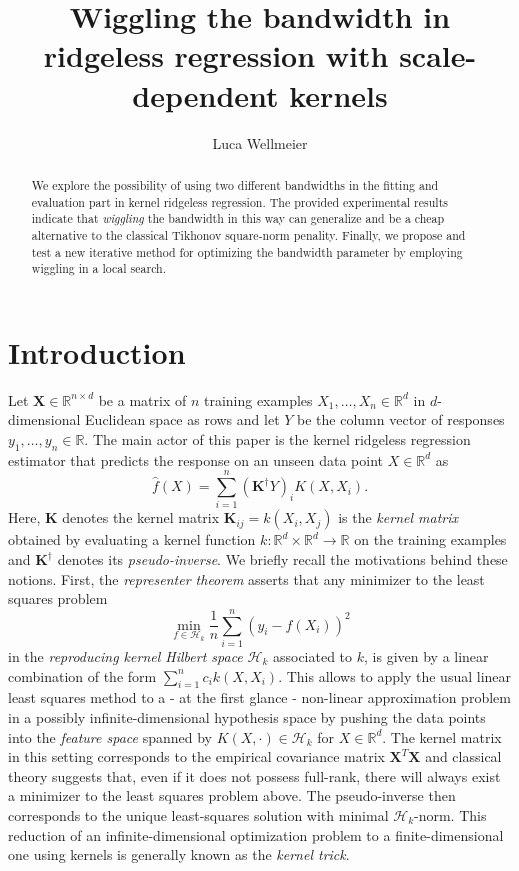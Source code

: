 \documentclass[12pt]{amsart}
\title{Wiggling the bandwidth in ridgeless regression 
        with scale-dependent kernels}
\author{Luca Wellmeier}
\newcommand{\R}{\mathbb{R}}
\begin{document}
\begin{abstract}
    We explore the possibility of using two different bandwidths in the 
    fitting and evaluation part in kernel ridgeless regression.
    The provided experimental results indicate that \textit{wiggling}
    the bandwidth in this way can generalize and be a cheap alternative to
    the classical Tikhonov square-norm penality.
    Finally, we propose and test a new iterative method for optimizing the 
    bandwidth parameter by employing wiggling in a local search.
\end{abstract}
\maketitle
\tableofcontents

\section{Introduction}
Let $\mathbf X \in \R^{n \times d}$ be a matrix of $n$ training examples
$X_1, \dots, X_n \in \R^d$ in $d$-dimensional Euclidean space as rows and 
let $Y$ be the column vector of responses $y_1, \dots, y_n \in \R$.
The main actor of this paper is the kernel ridgeless regression estimator
that predicts the response on an unseen data point $X \in \R^d$ as
\begin{equation} \label{eq:ridgeless}
    \hat f(X) = \sum_{i=1}^n (\mathbf K^\dagger Y)_i K(X, X_i).
\end{equation}
Here, $\mathbf K$ denotes the kernel matrix $\mathbf K_{ij} = k(X_i, X_j)$
is the \emph{kernel matrix} obtained by evaluating a kernel function 
$k \colon \R^d \times \R^d \to \R$ on the training examples and 
$\mathbf K^\dagger$ denotes its \emph{pseudo-inverse}.
We briefly recall the motivations behind these notions.
First, the \emph{representer theorem} asserts that any minimizer to the 
least squares problem
\[ \min_{f \in \mathcal H_k} \frac 1n \sum_{i=1}^n (y_i - f(X_i))^2 \]
in the \emph{reproducing kernel Hilbert space} $\mathcal H_k$ associated
to $k$, is given by a linear combination of the form
$\sum_{i=1}^n c_i k(X,X_i)$.
This allows to apply the usual linear least squares method to a - at the 
first glance - non-linear approximation problem in a possibly 
infinite-dimensional hypothesis space by pushing the data points into 
the \emph{feature space} spanned by $K(X, \cdot) \in \mathcal H_k$ 
for $X \in \R^d$.
The kernel matrix in this setting corresponds to the empirical covariance
matrix $\mathbf X^T \mathbf X$ and classical theory suggests that, even if 
it does not possess full-rank, there will always exist a minimizer to 
the least squares problem above.
The pseudo-inverse then corresponds to the unique least-squares solution
with minimal $\mathcal H_k$-norm.
This reduction of an infinite-dimensional optimization problem to a
finite-dimensional one using kernels is generally known as the 
\emph{kernel trick}.
\end{document}
